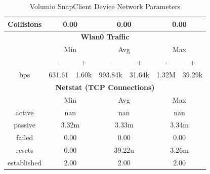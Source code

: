 \documentclass[11pt,a4paper]{scrreprt}
\begin{document}
\begin{table}[H]
\begin{tabular}{||c|c|c|c|c|c|c||}
    \hline
    Collisions & \multicolumn{2}{|c|}{0.00} & \multicolumn{2}{|c|}{0.00} & \multicolumn{2}{|c|}{0.00} \\
    \hline\hline
    \multicolumn{7}{|c|}{\textbf{Wlan0 Traffic}} \\
    \hline\hline
      & \multicolumn{2}{|c|}{Min} & \multicolumn{2}{|c|}{Avg} & \multicolumn{2}{|c|}{Max} \\
    \hline
      & - & + & - & + & - & + \\
    \hline
    bps  & 631.61 & 1.60k & 993.84k & 31.64k & 1.32M & 39.29k \\
    \hline\hline
    \multicolumn{7}{|c|}{\textbf{Netstat (TCP Connections)}} \\
    \hline\hline
      & \multicolumn{2}{|c|}{Min} & \multicolumn{2}{|c|}{Avg} & \multicolumn{2}{|c|}{Max} \\
    \hline
    active & \multicolumn{2}{|c|}{nan} & \multicolumn{2}{|c|}{nan} & \multicolumn{2}{|c|}{nan} \\
    \hline
    passive & \multicolumn{2}{|c|}{3.32m} & \multicolumn{2}{|c|}{3.33m} & \multicolumn{2}{|c|}{3.34m} \\
    \hline
    failed & \multicolumn{2}{|c|}{0.00} & \multicolumn{2}{|c|}{0.00} & \multicolumn{2}{|c|}{0.00} \\
    \hline
    resets & \multicolumn{2}{|c|}{0.00} & \multicolumn{2}{|c|}{39.22u} & \multicolumn{2}{|c|}{3.26m} \\
    \hline
    established & \multicolumn{2}{|c|}{2.00} & \multicolumn{2}{|c|}{2.00} & \multicolumn{2}{|c|}{2.00} \\
    \hline\hline
    \end{tabular}
    \caption{Volumio SnapClient Device Network Parameters}
    \label{VolumioclientNetTab}
\end{table}
\end{document}
